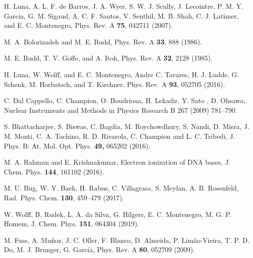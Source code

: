 \documentclass[10pt,showpacs,showkeys,twocolumn]{revtex4}
\begin{document}
\begin{thebibliography}{}
H. Luna, A. L. F. de Barros, J. A. Wyer, S. W. J. Scully, J. Lecointre, P. M. Y. Garcia, G. M. Sigaud, A. C. F. Santos,
V. Senthil, M. B. Shah, C. J. Latimer, and E. C. Montenegro,
Phys. Rev. A \textbf{75}, 042711 (2007).


 M. A. Bolorizadeh and M. E. Rudd, Phys. Rev. A \textbf{33}, 888 (1986). 




 M. E. Rudd, T. V. Goffe, and A. Itoh,  Phys. Rev. A \textbf{32}, 2128 (1985).


 H. Luna, W. Wolff, and E. C. Montenegro, Andre C. Tavares, H. J. Ludde, G. Schenk, M. Horbatsch, and T. Kirchner, Phys. Rev. A \textbf{93}, 052705 (2016).  

C. Dal Cappello, C. Champion, O. Boudrioua, H. Lekadir, Y. Sato , D. Ohsawa, 
Nuclear Instruments and Methods in Physics Research B 267 (2009) 781–790.

 S. Bhattacharjee, S. Biswas, C. Bagdia, M. Roychowdhury, S. Nandi, D. Misra, J. M. Monti, C. A. Tachino, R. D. Rivarola, C. Champion and L. C. Tribedi, J. Phys. B: At. Mol. Opt. Phys. \textbf{49,}  065202 (2016).



M. A. Rahman and E. Krishnakumar,
Electron ionization of DNA bases,
J. Chem. Phys. \textbf{144}, 161102 (2016).


M. U. Bug, W. Y. Baek, H. Rabus, C. Villagrasa, S. Meylan, A. B. Rosenfeld,
Rad. Phys. Chem. \textbf{130}, 459--479 (2017).


W. Wolff, B. Rudek, L. A. da Silva, G. Hilgers, E. C. Montenegro, 
M. G. P. Homem,
J. Chem. Phys. \textbf{151}, 064304 (2019).

M. Fuss, A. Muñoz, J. C. Oller, F. Blanco, D. Almeida, P. Limão-Vieira, 
T. P. D. Do, M. J. Brunger, G. Garc\'{i}a,
Phys. Rev. A \textbf{80}, 052709 (2009).


\end{thebibliography}
\end{document}
